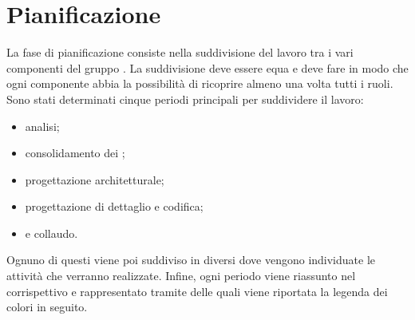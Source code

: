 \section{Pianificazione}
La fase di pianificazione consiste nella suddivisione del lavoro tra i vari componenti del gruppo \Gruppo . La suddivisione deve essere equa e deve fare in modo che ogni componente abbia la possibilità di ricoprire almeno una volta tutti i ruoli. Sono stati determinati cinque periodi principali per suddividere il lavoro:
\begin{itemize}
\item analisi;
\item consolidamento dei ;
\item progettazione architetturale;
\item progettazione di dettaglio e codifica;
\item {} e collaudo.
\end{itemize}
Ognuno di questi viene poi suddiviso in diversi  dove vengono individuate le attività che verranno realizzate.
Infine, ogni periodo viene riassunto nel corrispettivo  e rappresentato tramite  delle quali viene riportata la legenda dei colori in seguito.

